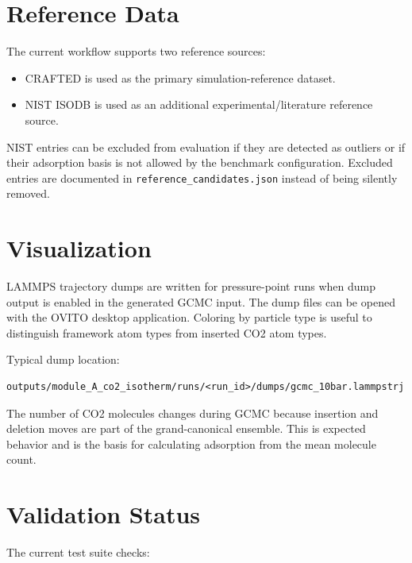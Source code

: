 \documentclass[11pt,a4paper]{article}
\begin{document}
\section{Reference Data}

The current workflow supports two reference sources:

\begin{itemize}
    \item CRAFTED is used as the primary simulation-reference dataset.
    \item NIST ISODB is used as an additional experimental/literature reference source.
\end{itemize}

NIST entries can be excluded from evaluation if they are detected as outliers or if their adsorption basis is not allowed by the benchmark configuration.
Excluded entries are documented in \texttt{reference\_candidates.json} instead of being silently removed.

\section{Visualization}

LAMMPS trajectory dumps are written for pressure-point runs when dump output is enabled in the generated GCMC input.
The dump files can be opened with the OVITO desktop application.
Coloring by particle type is useful to distinguish framework atom types from inserted CO2 atom types.

Typical dump location:

\begin{lstlisting}
outputs/module_A_co2_isotherm/runs/<run_id>/dumps/gcmc_10bar.lammpstrj
\end{lstlisting}

The number of CO2 molecules changes during GCMC because insertion and deletion moves are part of the grand-canonical ensemble.
This is expected behavior and is the basis for calculating adsorption from the mean molecule count.

\section{Validation Status}

The current test suite checks:
\end{document}
